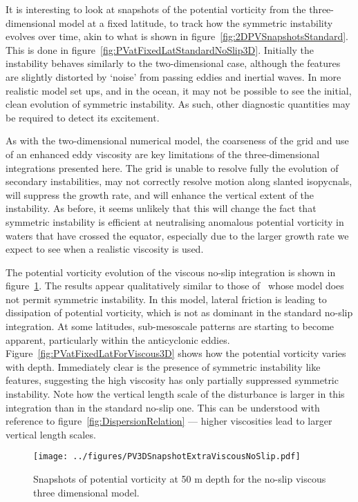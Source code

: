     It is interesting to look at snapshots of the potential vorticity from the three-dimensional model at a fixed latitude, to track how the symmetric instability evolves over time, akin to what is shown in figure~\ref{fig:2DPVSnapshotsStandard}. This is done in figure~\ref{fig:PVatFixedLatStandardNoSlip3D}. Initially the instability behaves similarly to the two-dimensional case, although the features are slightly distorted by `noise' from passing eddies and inertial waves. In more realistic model set ups, and in the ocean, it may not be possible to see the initial, clean evolution of symmetric instability. As such, other diagnostic quantities may be required to detect its excitement.

    As with the two-dimensional numerical model, the coarseness of the grid and use of an enhanced eddy viscosity are key limitations of the three-dimensional integrations presented here. The grid is unable to resolve fully the evolution of secondary instabilities, may not correctly resolve motion along slanted isopycnals, will suppress the growth rate, and will enhance the vertical extent of the instability. As before, it seems unlikely that this will change the fact that symmetric instability is efficient at neutralising anomalous potential vorticity in waters that have crossed the equator, especially due to the larger growth rate we expect to see when a realistic viscosity is used.

    The potential vorticity evolution of the viscous no-slip integration is shown in figure~\ref{fig:PV3DSnapshotViscousNoSlip}. The results appear qualitatively similar to those of~\citet{Edwards1998I} whose model does not permit symmetric instability. In this model, lateral friction is leading to dissipation of potential vorticity, which is not as dominant in the standard no-slip integration. At some latitudes, sub-mesoscale patterns are starting to become apparent, particularly within the anticyclonic eddies. Figure~\ref{fig:PVatFixedLatForViscous3D} shows how the potential vorticity varies with depth. Immediately clear is the presence of symmetric instability like features, suggesting the high viscosity has only partially suppressed symmetric instability. Note how the vertical length scale of the disturbance is larger in this integration than in the standard no-slip one. This  can be understood with reference to figure~\ref{fig:DispersionRelation} --- higher viscosities lead to larger vertical length scales.

    \begin{figure} 
        \centering
        \texttt{[image: ../figures/PV3DSnapshotExtraViscousNoSlip.pdf]}
        \caption{Snapshots of potential vorticity at 50 m depth for the no-slip viscous three dimensional model.}
        \label{fig:PV3DSnapshotViscousNoSlip}
    \end{figure}

